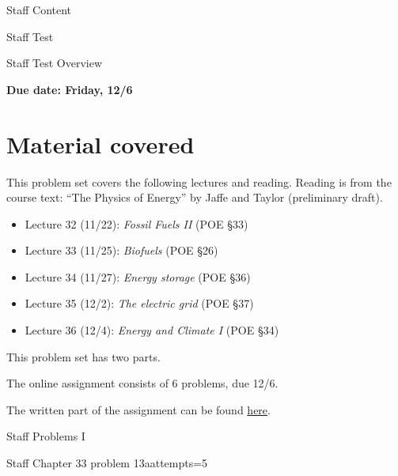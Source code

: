
\begin{edXchapter}{Staff Content}

\begin{edXsection}{Staff Test}

\begin{edXtext}{Staff Test Overview}


{\bf Due date: Friday, 12/6}

\section{Material covered}

This problem set covers the following lectures and reading.  Reading
is from the course text: ``The Physics of Energy'' by Jaffe and Taylor
(preliminary draft).

\begin{itemize}
\item Lecture 32 (11/22):  {\sl Fossil Fuels II}
   (POE  \S 33)
\item Lecture 33 (11/25):  {\sl  Biofuels}
   (POE  \S 26)
\item Lecture 34 (11/27):  {\sl Energy storage}
   (POE  \S 36)
\item Lecture 35 (12/2):  {\sl The electric grid}
   (POE  \S 37)
\item Lecture 36 (12/4):  {\sl Energy and Climate I}
   (POE  \S 34)
\end{itemize}

This problem set has two parts.

The online assignment consists of 6 problems, due 12/6.
 
The written part of the assignment can be found \href{http://physicsofenergy.mit.edu/students/problems.php}{here}.

\end{edXtext}

\end{edXsection}



\begin{edXsection}{Staff Problems I}

\begin{edXvertical}

\begin{edXproblem}{Staff Chapter 33 problem 13a}{attempts=5}


\end{edXproblem}
\end{edXvertical}
\end{edXsection}
\end{edXchapter}

